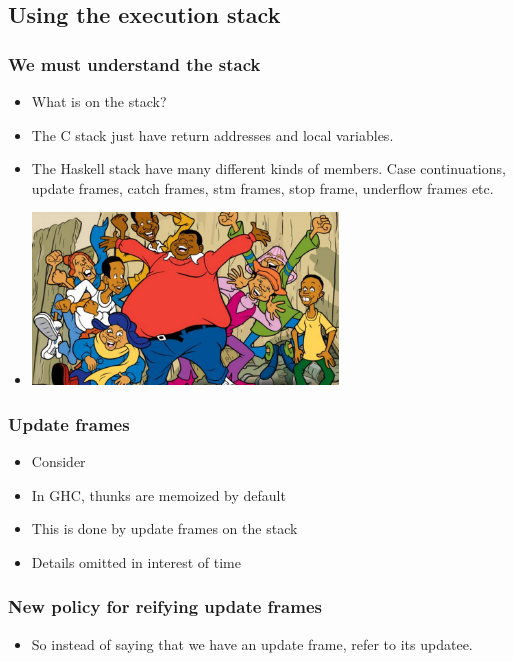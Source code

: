 \documentclass[11pt]{beamer} %
\begin{document}
\subsection{Using the execution stack}

  \begin{frame}
   \frametitle{We must understand the stack}
  \begin{itemize}
   \item <1-> What is on the stack?
   \item <2-> The C stack just have return addresses and local variables.
   \item <3-> The Haskell stack have many different kinds of members. Case
     continuations, update frames, catch frames, stm frames, stop frame,
     underflow frames etc.
   \item <4->
     \includegraphics[width=3.2in]{fig/junkyard-gang}
  \end{itemize}
  \end{frame}

  \begin{frame}
   \frametitle{Update frames}
  \begin{itemize}
   \item <1-> Consider
     \obviouslyThunkCode
   \item <2-> In GHC, thunks are memoized by default
   \item <3-> This is done by update frames on the stack
   \item <4-> Details omitted in interest of time
  \end{itemize}
  \end{frame}

  \begin{frame}
   \frametitle{New policy for reifying update frames}
  \begin{itemize}
   \item <1-> So instead of saying that we have an update frame, refer to its
     updatee.
  \end{itemize}
     \improvedTraceCode
  \end{frame}
\end{document}
